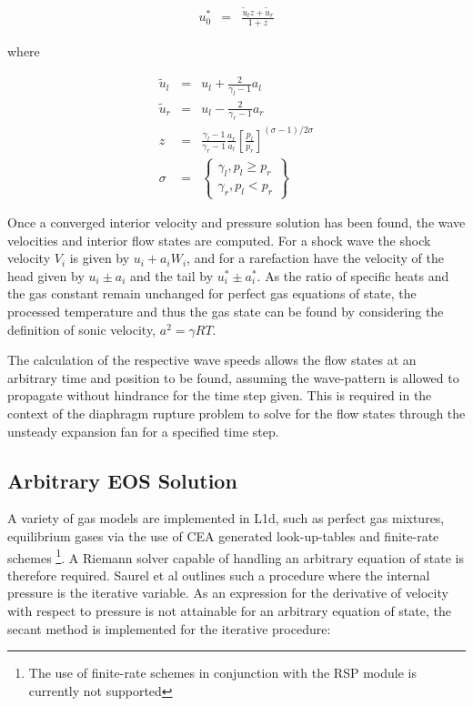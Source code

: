 \documentclass[a4paper,10pt]{article}
\begin{document}
\begin{eqnarray}
u_{0}^{*} &=& \frac{ \widetilde{u}_{l} z + \widetilde{u}_{r}}{1+z} \label{pg_u_ig}
\end{eqnarray}

where

\begin{eqnarray}
\widetilde{u}_{l} &=& u_{l} + \frac{2}{\gamma_{l} - 1}a_{l} \label{u_left} \\
\widetilde{u}_{r} &=& u_{l} - \frac{2}{\gamma_{r} - 1}a_{r} \label{u_right} \\
z &=& \frac{ \gamma_{l}- 1 }{ \gamma_{r} - 1 } \frac{a_{r}}{a_{l}} \left [ \frac{p_{l}}{p_{r}} \right ] ^{ (\sigma - 1) / 2 \sigma } \label{z_uni} \\
\sigma &=& \left\{ \begin{array}{c} \gamma_{l}, p_{l} \geq p_{r} \\
\gamma_{r}, p_{l} < p_{r} \end{array} \right\} \label{sigma_riem}
\end{eqnarray}

 Once a converged interior velocity and pressure solution has been found, the wave velocities and interior flow states are computed.  For a shock wave the shock velocity $V_{i}$ is given by $u_{i} + a_{i} W_{i} $, and for a rarefaction have the velocity of the head given by $u_{i} \pm a_{i}$ and the tail by  $u_{i}^{*} \pm a_{i}^{*}$.  As the ratio of specific heats and the gas constant remain unchanged for perfect gas equations of state, the processed temperature and thus the gas state can be found by considering the definition of sonic velocity, $a^{2} = \gamma R T$.
\par
\medskip
The calculation of the respective wave speeds allows the flow states at an arbitrary time and position to be found, assuming the wave-pattern is allowed to propagate without hindrance for the time step given.  This is required in the context of the diaphragm rupture problem to solve for the flow states through the unsteady expansion fan for a specified time step.

\subsection{Arbitrary EOS Solution}

A variety of gas models are implemented in L1d, such as perfect gas mixtures, equilibrium gases via the use of CEA generated look-up-tables and finite-rate schemes \footnote{The use of finite-rate schemes in conjunction with the RSP module is currently not supported}.  A Riemann solver capable of handling an arbitrary equation of state is therefore required.  Saurel et al \cite{saurel} outlines such a procedure where the internal pressure is the iterative variable.  As an expression for the derivative of velocity with respect to pressure is not attainable for an arbitrary equation of state, the secant method is implemented for the iterative procedure:
\end{document}
